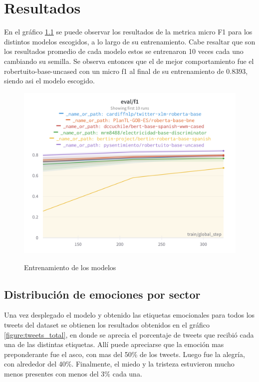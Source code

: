 \chapter{Resultados}



En el gráfico \ref{figure:Entrenamiento_modelos} se puede observar los resultados de la metrica micro F1 para los distintos modelos escogidos, a lo largo de su entrenamiento. Cabe resaltar que son los resultados promedio de cada modelo estos se entrenaron 10 veces cada uno cambiando su semilla. Se observa entonces que el de mejor comportamiento fue el robertuito-base-uncased con un micro f1 al final de su entrenamiento de 0.8393, siendo asi el modelo escogido.


\begin{figure}[h]
	\caption{Entrenamiento de los modelos}
	\centering
	\includegraphics[scale=0.15]{../Images/Results/W&B Chart 5_18_2023, 7_25_13 PM (1).png} 
	\label{figure:Entrenamiento_modelos}
\end{figure}


\section{Distribución de emociones por sector}

Una vez desplegado el modelo y obtenido las etiquetas emocionales para todos los tweets del dataset se obtienen los resultados obtenidos en el gráfico \ref{figure:tweets_total}, en donde se aprecia el porcentaje de tweets que recibió cada una de las distintas etiquetas. Allí puede apreciarse que la emoción mas preponderante fue el asco, con mas del 50\% de los tweets. Luego fue la alegría, con alrededor del  40\%. Finalmente, el miedo y la tristeza estuvieron mucho menos presentes con menos del 3\% cada una. 

